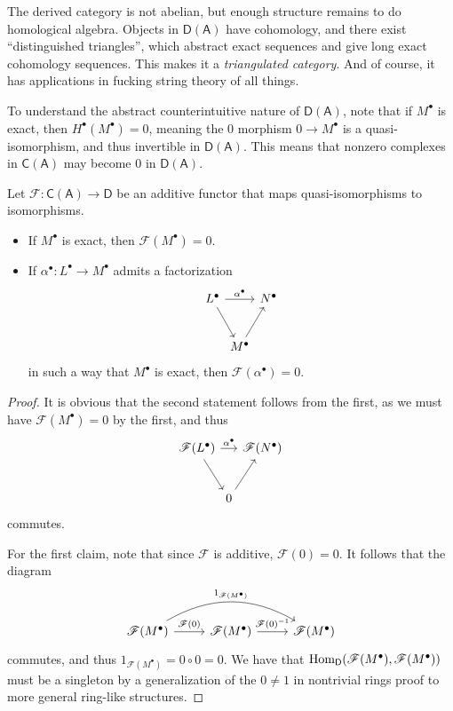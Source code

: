 The derived category is not abelian, but enough structure remains to do homological algebra. Objects in $\mathsf{D} (\mathsf{A} )$ have cohomology, and there exist ``distinguished triangles'', which abstract exact sequences and give long exact cohomology sequences. This makes it a \emph{triangulated category}. And of course, it has applications in fucking string theory of all things.

To understand the abstract counterintuitive nature of $\mathsf{D} (\mathsf{A} )$, note that if $M^\bullet $ is exact, then $H^\bullet (M^\bullet )=0$, meaning the 0 morphism $0\to M^\bullet $ is a quasi-isomorphism, and thus invertible in $\mathsf{D} (\mathsf{A} )$. This means that nonzero complexes in $\mathsf{C} (\mathsf{A} )$ may become 0 in $\mathsf{D} (\mathsf{A} )$.

\begin{lemma}\label{lma:9.4.1}
	Let $\mathscr{F} : \mathsf{C} (\mathsf{A} ) \to \mathsf{D} $ be an additive functor that maps quasi-isomorphisms to isomorphisms.
	\begin{itemize}
		\item If $M^\bullet $ is exact, then $\mathscr{F} (M^\bullet )=0$.
		\item If $\alpha ^\bullet : L^\bullet  \to M^\bullet $ admits a factorization
			\[\begin{tikzcd}[row sep = 2.5em, column sep = 0em]
				L^\bullet \ar[rr, "\alpha ^\bullet "]\ar[dr]&&N^\bullet \\
									    &M^\bullet \ar[ur]
			\end{tikzcd}\]
			in such a way that $M^\bullet $ is exact, then $\mathscr{F} (\alpha ^\bullet )=0$.
	\end{itemize}
\end{lemma}
\begin{proof}
	It is obvious that the second statement follows from the first, as we must have $\mathscr{F} (M^\bullet )=0$ by the first, and thus
	\[\begin{tikzcd}[row sep = 2.5em, column sep = 0em]
		\mathscr{F} (L^\bullet )\ar[rr, "\alpha ^\bullet "]\ar[dr]&&\mathscr{F} (N^\bullet )\\
								   &0\ar[ur]
	\end{tikzcd}\]
	commutes.

	For the first claim, note that since $\mathscr{F} $ is additive, $\mathscr{F} (0)=0$. It follows that the diagram
	\[\begin{tikzcd}[row sep = 2.5em, column sep = 2.5em]
		\mathscr{F} (M^\bullet )\ar[r, "\mathscr{F} (0)"]\ar[rr, bend left, "1_{\mathscr{F} (M^\bullet )} "]&\mathscr{F} (M^\bullet )\ar[r, "\mathscr{F} (0)^{-1} "]&\mathscr{F} (M^\bullet )
	\end{tikzcd}\]
	commutes, and thus $1_{\mathscr{F} (M^\bullet )} =0\circ 0=0$. We have that $\operatorname{Hom}_{\mathsf{D} }(\mathscr{F} (M^\bullet ), \mathscr{F} (M^\bullet )) $ must be a singleton by a generalization of the $0\neq 1$ in nontrivial rings proof to more general ring-like structures.
\end{proof}

